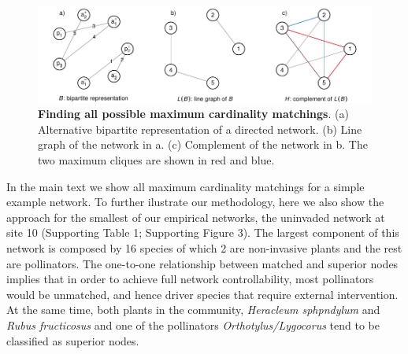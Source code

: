 \documentclass[a4paper]{artikel1}
\begin{document}
\begin{figure}[htbp]
\centering
\includegraphics{supp_info_2_files/figure-latex/fig-finding-all-matchings-1.pdf}
\caption{\textbf{Finding all possible maximum cardinality matchings}.
(a) Alternative bipartite representation of a directed network. (b) Line
graph of the network in a. (c) Complement of the network in b. The two
maximum cliques are shown in red and blue.}
\end{figure}

In the main text we show all maximum cardinality matchings for a simple
example network. To further ilustrate our methodology, here we also show
the approach for the smallest of our empirical networks, the uninvaded
network at site 10 (Supporting Table 1; Supporting Figure 3). The
largest component of this network is composed by 16 species of which 2
are non-invasive plants and the rest are pollinators. The one-to-one
relationship between matched and superior nodes implies that in order to
achieve full network controllability, most pollinators would be
unmatched, and hence driver species that require external intervention.
At the same time, both plants in the community, \emph{Heracleum
sphpndylum} and \emph{Rubus fructicosus} and one of the pollinators
\emph{Orthotylus/Lygocorus} tend to be classified as superior nodes.
\end{document}
